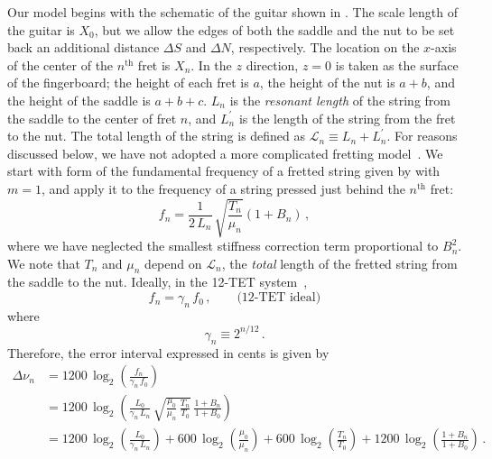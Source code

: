 Our model begins with the schematic of the guitar shown in . The scale length of the guitar is $X_0$, but we allow the edges of both the saddle and the nut to be set back an additional distance $\Delta S$ and $\Delta N$, respectively. The location on the $x$-axis of the center of the $n^\textrm{th}$ fret is $X_n$. In the $z$ direction, $z = 0$ is taken as the surface of the fingerboard; the height of each fret is $a$, the height of the nut is $a + b$, and the height of the saddle is $a + b + c$. $L_n$ is the \emph{resonant length} of the string from the saddle to the center of fret $n$, and $L^\prime_n$ is the length of the string from the fret to the nut. The total length of the string is defined as $\mathcal{L}_n \equiv L_n + L^\prime_n$. For reasons discussed below, we have not adopted a more complicated fretting model~\cite{ref:byers1996cgi,ref:varieschi2010icf}. We start with form of the fundamental frequency of a fretted string given by  with $m = 1$, and apply it to the frequency of a string pressed just behind the $n^\mathrm{th}$ fret:
 \begin{equation} \label{eqn:f_n_def}
f_n = \frac{1}{2\, L_n}\, \sqrt{\frac{T_n}{\mu_n}} \left( 1 + B_n \right)\, ,
 \end{equation}
where we have neglected the smallest stiffness correction term proportional to $B_n^2$. We note that $T_n$ and $\mu_n$ depend on $\mathcal{L}_n$, the \emph{total} length of the fretted string from the saddle to the nut. Ideally, in the 12-TET system~\cite{ref:durfee2015pms},
 \begin{equation} \label{eqn:f_n_tet}
f_n = \gamma_n\, f_0\, , \qquad \textrm{(12-TET~ideal)}
 \end{equation}
where
 \begin{equation} \label{eqn:gamme_n_def}
\gamma_n \equiv 2^{n / 12}\, .
 \end{equation}
Therefore, the error interval expressed in cents is given by
 \begin{equation}\label{eqn:error_def}
 \begin{split}
\Delta \nu_n &= 1200\, \log_2\left( \frac{f_n}{\gamma_n\, f_0} \right) \\
&= 1200\, \log_2 \left( \frac{L_0}{\gamma_n\, L_n}\, \sqrt{\frac{\mu_0}{\mu_n}\, \frac{T_n}{T_0}}\, \frac{1 + B_n}{1 + B_0} \right) \\
&= 1200\, \log_2 \left( \frac{L_0}{\gamma_n\, L_n} \right) + 600\, \log_2 \left(  \frac{\mu_0}{\mu_n} \right) + 600\, \log_2 \left( \frac{T_n}{T_0} \right) + 1200\, \log_2 \left( \frac{1 + B_n}{1 + B_0} \right)\, .
 \end{split}
 \end{equation}

